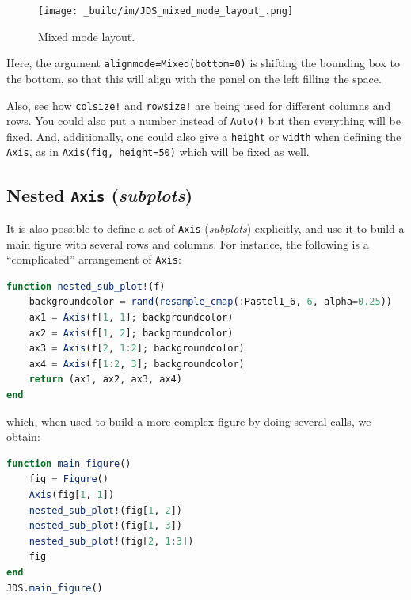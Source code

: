 \documentclass[
  notoc %
]{tufte-book}
\newcommand{\passthrough}[1]{#1}
\begin{document}
\begin{figure}
\hypertarget{fig:mixed_mode_layout}{%
\centering
\texttt{[image: \_build/im/JDS\_mixed\_mode\_layout\_.png]}
\caption{Mixed mode layout.}\label{fig:mixed_mode_layout}
}
\end{figure}

Here, the argument \passthrough{\lstinline!alignmode=Mixed(bottom=0)!}
is shifting the bounding box to the bottom, so that this will align with
the panel on the left filling the space.

Also, see how \passthrough{\lstinline"colsize!"} and
\passthrough{\lstinline"rowsize!"} are being used for different columns
and rows. You could also put a number instead of
\passthrough{\lstinline!Auto()!} but then everything will be fixed. And,
additionally, one could also give a \passthrough{\lstinline!height!} or
\passthrough{\lstinline!width!} when defining the
\passthrough{\lstinline!Axis!}, as in
\passthrough{\lstinline!Axis(fig, height=50)!} which will be fixed as
well.

\hypertarget{nested-axis-subplots}{%
\subsection{\texorpdfstring{Nested \texttt{Axis}
(\emph{subplots})}{Nested Axis (subplots)}}\label{nested-axis-subplots}}

It is also possible to define a set of \passthrough{\lstinline!Axis!}
(\emph{subplots}) explicitly, and use it to build a main figure with
several rows and columns. For instance, the following is a
``complicated'' arrangement of \passthrough{\lstinline!Axis!}:

\begin{lstlisting}[language=Julia]
function nested_sub_plot!(f)
    backgroundcolor = rand(resample_cmap(:Pastel1_6, 6, alpha=0.25))
    ax1 = Axis(f[1, 1]; backgroundcolor)
    ax2 = Axis(f[1, 2]; backgroundcolor)
    ax3 = Axis(f[2, 1:2]; backgroundcolor)
    ax4 = Axis(f[1:2, 3]; backgroundcolor)
    return (ax1, ax2, ax3, ax4)
end
\end{lstlisting}

which, when used to build a more complex figure by doing several calls,
we obtain:

\begin{lstlisting}[language=Julia]
function main_figure()
    fig = Figure()
    Axis(fig[1, 1])
    nested_sub_plot!(fig[1, 2])
    nested_sub_plot!(fig[1, 3])
    nested_sub_plot!(fig[2, 1:3])
    fig
end
JDS.main_figure()
\end{lstlisting}
\end{document}
